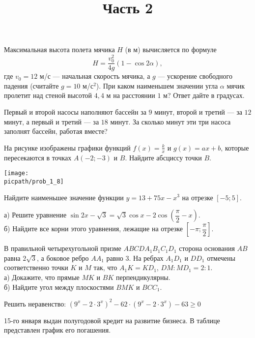 \begin{training}[2]
\begin{listofex}
		Максимальная высота полета мячика \( H \) (в м) вычисляется по формуле
		\[ H=\dfrac{v_0^2}{4g}(1-\cos2\alpha), \]
		где \( v_0 = 12 \) м/с --- начальная скорость мячика, а \( g \) --- ускорение свободного падения (считайте \( g = 10 \) м/с\( ^2 \)).
		При каком наименьшем значении угла \( \alpha \) мячик пролетит над стеной высотой \( 4,4 \) м на расстоянии \( 1 \) м?
		Ответ дайте в градусах.
		\foranswer
		\newpage
		\hphantom{Часть 1}
		\item Первый и второй насосы наполняют бассейн за \( 9 \) минут,
		второй и третий --- за \( 12 \) минут, а первый и третий --- за \( 18 \) минут.
		За сколько минут эти три насоса заполнят бассейн, работая вместе?
		\foranswer
		\item 
		На рисунке изображены графики функций \( f(x) = \frac{k}{x} \) и \( g(x) = ax+b \),
		которые пересекаются в точках \( A(-2;-3) \) и \( B \). Найдите абсциссу точки \( B \).
		\begin{center}
			\texttt{[image: \\picpath/prob\_1\_8]}
		\end{center}
		\foranswer
		\item Найдите наименьшее значение функции \( y=13+75x-x^3 \) на отрезке \( [-5;5] \).
		\foranswer
		\egepreambtwo
		\title{Часть 2}
		\egepreambthree
		\item
		а) Решите уравнение \( \sin2x - \sqrt{3} = \sqrt{3}\cos x - 2\cos \left( \dfrac{\pi}{2} - x \right) \).\\
		б) Найдите все корни этого уравнения, лежащие на отрезке \( \left[ -\pi;\dfrac{\pi}{2} \right] \).
		\item
		В правильной четырехугольной призме \( ABCDA_1B_1C_1D_1 \) сторона
		основания \( AB \) равна \( 2\sqrt{3} \), а боковое ребро \( AA_1 \) равно \( 3 \).
		На ребрах \( A_1D_1 \) и \( DD_1 \) отмечены соответственно точки \( K \) и \( M \) так,
		что \( A_1K = KD_1 \), \( DM : MD_1 = 2 : 1 \).\\
		а) Докажите, что прямые \( MK \) и \( BK \) перпендикулярны.\\
		б) Найдите угол между плоскостями \( BMK \) и \( BCC_1 \).
		\item Решить неравенство:
		\( (9^x-2\cdot3^x)^2-62\cdot(9^x-2\cdot3^x)-63\ge0 \)
		\item 15-го января выдан полугодовой кредит на развитие бизнеса. В таблице
		представлен график его погашения.
		\begin{center}
			\begin{tabular}{|c|c|c|c|c|c|c|c|}

\end{tabular}
\end{center}
\end{listofex}
\end{training}
